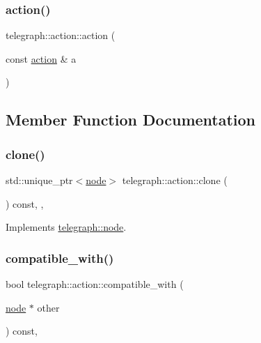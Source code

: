 \subsubsection{\texorpdfstring{action()}{action()}\hspace{0.1cm}{\footnotesize\ttfamily [2/2]}}
{\footnotesize\ttfamily telegraph\+::action\+::action (\begin{DoxyParamCaption}\item[{const \hyperlink{classtelegraph_1_1action}{action} \&}]{a }\end{DoxyParamCaption})\hspace{0.3cm}{\ttfamily [inline]}}



\subsection{Member Function Documentation}
\mbox{\label{classtelegraph_1_1action_aa72bffae4f241be8a4366e3c7344a17b}} 
\subsubsection{\texorpdfstring{clone()}{clone()}}
{\footnotesize\ttfamily std\+::unique\+\_\+ptr$<$\hyperlink{classtelegraph_1_1node}{node}$>$ telegraph\+::action\+::clone (\begin{DoxyParamCaption}{ }\end{DoxyParamCaption}) const\hspace{0.3cm}{\ttfamily [inline]}, {\ttfamily [override]}, {\ttfamily [virtual]}}



Implements \hyperlink{classtelegraph_1_1node_ae90515f4573cfa43c168cba9d542df6b}{telegraph\+::node}.

\mbox{\label{classtelegraph_1_1action_a372bd4f9c1b7b4698e151448d5c28af9}} 
\subsubsection{\texorpdfstring{compatible\+\_\+with()}{compatible\_with()}}
{\footnotesize\ttfamily bool telegraph\+::action\+::compatible\+\_\+with (\begin{DoxyParamCaption}\item[{\hyperlink{classtelegraph_1_1node}{node} $\ast$}]{other }\end{DoxyParamCaption}) const\hspace{0.3cm}{\ttfamily [override]}, {\ttfamily [virtual]}}



